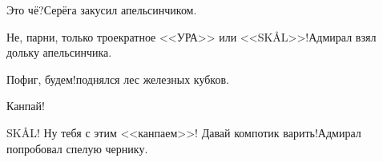 \diagdash Это чё?\mdash Серёга закусил апельсинчиком.

%

%	
%	
%	




\diagdash Не, парни, только троекратное <<УРА>> или <<SKÅL>>!\mdash Адмирал взял дольку апельсинчика.



\diagdash Пофиг, будем!\mdash поднялся лес железных кубков.

\diagdash Канпай!

\diagdash SKÅL! Ну тебя с этим <<канпаем>>! Давай компотик варить!\mdash Адмирал попробовал спелую чернику.

